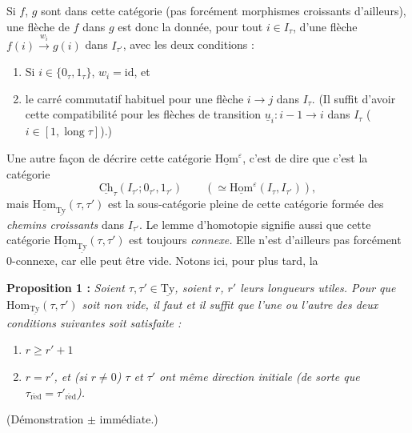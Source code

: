 \documentclass[11pt]{article}
\newcommand{\printedpage}[1]{\marginpar{\footnotesize p.~#1}}
\newcommand{\msp}[1]{\marginpar{\footnotesize [#1]}}
\newcommand{\uTy}{\underline{\mathrm{Ty}}}
\newcommand{\Ty}{\underline{\mathrm{Ty}}}
\newcommand{\red}{\mathrm{r\acute{e}d}}
\newcommand{\uHom}{\underline{\mathrm{Hom}}}
\newcommand{\ul}[1]{\underline{#1}}
\begin{document}
Si $f$, $g$ sont dans cette catégorie (pas forcément morphismes croissants d'ailleurs), une flèche de $f$ dans $g$ est donc la donnée, pour tout $i\in I_\tau$, d'une flèche $f(i)\xrightarrow{w_i}g(i)$ dans $I_{\tau'}$, avec les deux conditions :

\begin{enumerate}[label={}, leftmargin=*]
\item[a)] Si $i\in\{0_\tau,1_\tau\}$, $w_i=\mathrm{id}$, et
\item[b)] le carré commutatif habituel pour une flèche $i\longrightarrow j$ dans $I_\tau$. (Il suffit d'avoir cette compatibilité pour les flèches de transition $\ul{u}_i:i-1\longrightarrow i$ dans $I_\tau$ ($i\in[1,\operatorname{long}\tau]$).)
\end{enumerate}

Une autre façon de décrire cette catégorie $\uHom^\varepsilon$, c'est de dire que c'est la catégorie
\msp{page 84}
\[
\underline{\mathrm{Ch}}_\tau(I_{\tau'};0_{\tau'},1_{\tau'})\qquad(\simeq\uHom^\varepsilon(I_\tau,I_{\tau'})),
\]
mais $\uHom_{\uTy}(\tau,\tau')$ est la sous-catégorie pleine de cette catégorie formée des \textit{chemins croissants} dans $I_{\tau'}$. Le lemme d'homotopie signifie aussi que cette catégorie $\uHom_{\uTy}(\tau,\tau')$ est toujours \textit{connexe.} Elle n'est d'ailleurs pas forcément 0-connexe, car elle peut être vide. Notons ici, pour plus tard, la

\textbf{Proposition 1 :} \textit{Soient $\tau,\tau'\in\Ty$, soient $r$, $r'$ leurs longueurs utiles. Pour que $\mathrm{Hom}_{\uTy}(\tau,\tau')$ soit non vide, il faut et il suffit que l'une ou l'autre des deux conditions suivantes soit satisfaite :}

\begin{enumerate}[label={}, leftmargin=*]
\item[\textit{a)}] $r\geq r'+1$

\printedpage{55}

\item[\textit{b)}] \textit{$r=r'$, et (si $r\neq0$) $\tau$ et $\tau'$ ont même direction initiale (de sorte que $\tau_{\red}=\tau'_{\red}$).}
\end{enumerate}

(Démonstration $\pm$ immédiate.)
\end{document}
